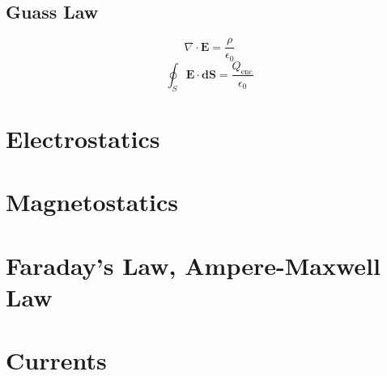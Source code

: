 \documentclass{article}
\begin{document}
    \subsection{Guass Law}
    \begin{definition}
        \begin{equation}
            \nabla \cdot \mathbf{E} = \frac{\rho}{\epsilon_0}
        \end{equation}
        \begin{equation}
            \oint_S \mathbf{E} \cdot \mathbf{dS} = \frac{Q_{\text{enc}}}{\epsilon_0}
        \end{equation}
    \end{definition}

\section{Electrostatics}
\subsection{}

\section{Magnetostatics}
\subsection{}

\section{Faraday's Law, Ampere-Maxwell Law}
\subsection{}

\section{Currents}
\subsection{}
\end{document}
